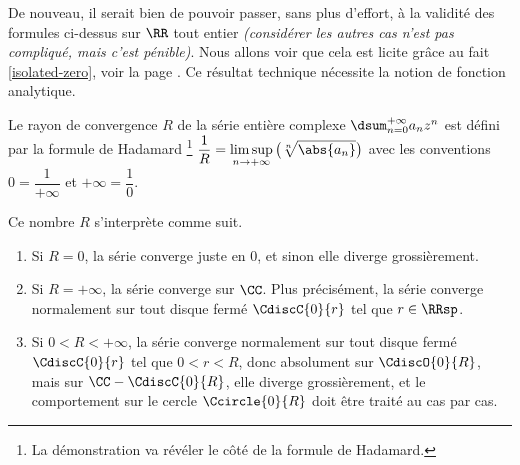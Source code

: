 De nouveau, il serait bien de pouvoir passer, sans plus d'effort, à la validité des formules ci-dessus sur $\RR$ tout entier \emph{(considérer les autres cas n'est pas compliqué, mais c'est pénible)}.
%
Nous allons voir que cela est licite grâce au fait \ref{isolated-zero}, voir la page \pageref{isolated-zero}. Ce résultat technique nécessite la notion de fonction analytique.




\begin{preli} \label{conv-ray}
    Le rayon de convergence $R$ de la série entière complexe $\dsum_{n=0}^{+\infty} a_n z^n$ est défini par la formule de Hadamard%
    \footnote{
    	La démonstration va révéler le côté  de la formule de Hadamard.
    }
    $\displaystyle \frac{1}{R} = \limsup_{n \to +\infty} \big( \sqrt[n]{\abs{a_n}} \big)$
    avec les conventions
    $0 = \dfrac{1}{+\infty}$
    et
    $+\infty = \dfrac{1}{0}$.

    \newpage
    
    Ce nombre $R$ s'interprète comme suit.
    \begin{enumerate}
        \item Si $R = 0$, la série converge juste en $0$, et sinon elle diverge grossièrement.

        \item Si $R = +\infty$, la série converge sur $\CC$.
        Plus précisément, la série converge normalement sur tout disque fermé $\CdiscC{0}{r}$ tel que $r \in \RRsp$. 

        \item Si $0 < R < +\infty$, la série converge normalement sur tout disque fermé $\CdiscC{0}{r}$ tel que $0 < r < R$,
        donc absolument sur $\CdiscO{0}{R}$,
        mais sur $\CC - \CdiscC{0}{R}$, elle diverge grossièrement,
        et
        le comportement sur le cercle $\Ccircle{0}{R}$ doit être traité au cas par cas.
    \end{enumerate}
\end{preli}


